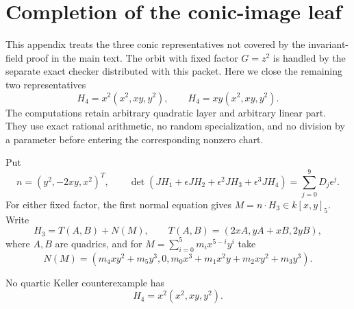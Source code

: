 \section{Completion of the conic-image leaf}
\label{app:quartic-conic-completion}

This appendix treats the three conic representatives not covered by the
invariant-field proof in the main text.  The orbit with fixed factor
\(G=z^2\) is handled by the separate exact checker distributed with this
packet.  Here we close the remaining two representatives
\[
 H_4=x^2(x^2,xy,y^2),\qquad
 H_4=xy(x^2,xy,y^2).
\]
The computations retain arbitrary quadratic layer and arbitrary linear part.
They use exact rational arithmetic, no random specialization, and no division
by a parameter before entering the corresponding nonzero chart.

Put
\[
 n=(y^2,-2xy,x^2)^T,
 \qquad
 \det(JH_1+\epsilon JH_2+\epsilon^2JH_3+\epsilon^3JH_4)
 =\sum_{j=0}^9D_j\epsilon^j.
\]
For either fixed factor, the first normal equation gives
\(M=n\cdot H_3\in k[x,y]_5\).  Write
\[
 H_3=T(A,B)+N(M),\qquad
 T(A,B)=(2xA,yA+xB,2yB),
\]
where \(A,B\) are quadrics, and for
\(M=\sum_{i=0}^5m_ix^{5-i}y^i\) take
\[
 N(M)=
 \left(m_4xy^2+m_5y^3,0,
 m_0x^3+m_1x^2y+m_2xy^2+m_3y^3\right).
\]

\begin{theorem}
\label{thm:quartic-conic-x2}
No quartic Keller counterexample has
\[
 H_4=x^2(x^2,xy,y^2).
\]
\end{theorem}

